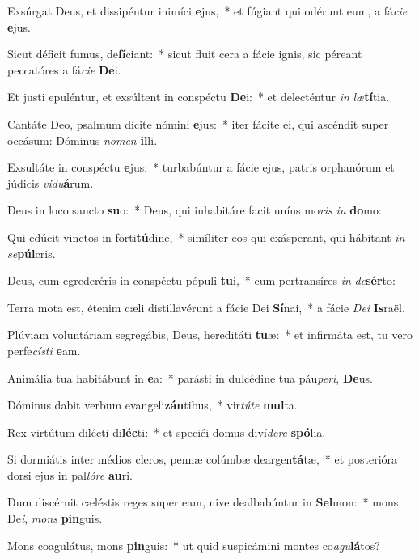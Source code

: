 \item Exsúrgat Deus, et dissipéntur inimíci \textbf{e}jus,~* et fúgiant qui odérunt eum, a fá\textit{ci}\textit{e} \textbf{e}jus.
\item Sicut déficit fumus, de\textbf{fí}ciant:~* sicut fluit cera a fácie ignis, sic péreant peccatóres a fá\textit{ci}\textit{e} \textbf{De}i.
\item Et justi epuléntur, et exsúltent in conspéctu \textbf{De}i:~* et delecténtur \textit{in} \textit{læ}\textbf{tí}tia.
\item Cantáte Deo, psalmum dícite nómini \textbf{e}jus:~* iter fácite ei, qui ascéndit super occásum: Dóminus \textit{no}\textit{men} \textbf{il}li.
\item Exsultáte in conspéctu \textbf{e}jus:~* turbabúntur a fácie ejus, patris orphanórum et júdicis \textit{vi}\textit{du}\textbf{á}rum.
\item Deus in loco sancto \textbf{su}o:~* Deus, qui inhabitáre facit uníus mo\textit{ris} \textit{in} \textbf{do}mo:
\item Qui edúcit vinctos in forti\textbf{tú}dine,~* simíliter eos qui exásperant, qui hábitant \textit{in} \textit{se}\textbf{púl}cris.
\item Deus, cum egrederéris in conspéctu pópuli \textbf{tu}i,~* cum pertransíres \textit{in} \textit{de}\textbf{sér}to:
\item Terra mota est, étenim cæli distillavérunt a fácie Dei \textbf{Sí}nai,~* a fácie \textit{De}\textit{i} \textbf{Is}raël.
\item Plúviam voluntáriam segregábis, Deus, hereditáti \textbf{tu}æ:~* et infirmáta est, tu vero perfe\textit{cís}\textit{ti} \textbf{e}am.
\item Animália tua habitábunt in \textbf{e}a:~* parásti in dulcédine tua páu\textit{pe}\textit{ri}, \textbf{De}us.
\item Dóminus dabit verbum evangeli\textbf{zán}tibus,~* vir\textit{tú}\textit{te} \textbf{mul}ta.
\item Rex virtútum dilécti di\textbf{léc}ti:~* et speciéi domus diví\textit{de}\textit{re} \textbf{spó}lia.
\item Si dormiátis inter médios cleros, pennæ colúmbæ deargen\textbf{tá}tæ,~* et posterióra dorsi ejus in pal\textit{ló}\textit{re} \textbf{au}ri.
\item Dum discérnit cæléstis reges super eam, nive dealbabúntur in \textbf{Sel}mon:~* mons De\textit{i}, \textit{mons} \textbf{pin}guis.
\item Mons coagulátus, mons \textbf{pin}guis:~* ut quid suspicámini montes co\textit{a}\textit{gu}\textbf{lá}tos?
